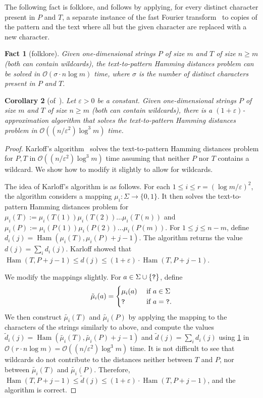 \documentclass[11pt, letterpaper]{article}
\theoremstyle{plain}
\newtheorem{fact}{Fact}
\newtheorem{corollary}[fact]{Corollary}
\theoremstyle{definition}
\theoremstyle{remark}
\renewcommand{\O}{\mathcal{O}}
\DeclareMathOperator*{\Ham}{Ham}
\begin{document}
The following fact is folklore, and follows by applying, for every distinct character present in $P$ and $T$, a separate instance of the fast Fourier transform~\cite{FischerP74} to copies of the pattern and the text where all but the given character are replaced with a new character.

\begin{fact}[folklore]\label{fact:sigman1d}
Given one-dimensional strings $P$ of size $m$ and $T$ of size $n \ge m$ (both can contain wildcards), the text-to-pattern Hamming distances problem can be solved in $\O(\sigma \cdot n \log m)$ time, where $\sigma$ is the number of distinct characters present in $P$ and $T$.
\end{fact}

\begin{corollary}[of~\cite{Karloff1993}]\label{cor:approx1d}
Let $\varepsilon > 0$ be a constant. Given one-dimensional strings $P$ of size $m$ and $T$ of size $n \ge m$ (both can contain wildcards), there is a $(1+\varepsilon)$-approximation algorithm that solves the text-to-pattern Hamming distances problem in $\O((n/\varepsilon^2)  \log^3 m)$ time.
\end{corollary}
\begin{proof}
Karloff's algorithm~\cite{Karloff1993} solves the text-to-pattern Hamming distances problem for $P,T$ in $\O((n/\varepsilon^2)  \log^3 m)$ time assuming that neither $P$ nor $T$ contains a wildcard. We show how to modify it slightly to allow for wildcards. 

The idea of Karloff's algorithm is as follows. For each $1 \le i \le r = (\log m/ \varepsilon)^2$, the algorithm considers a mapping $\mu_i : \Sigma \rightarrow \{0,1\}$. It then solves the text-to-pattern Hamming distances problem for $\mu_i(T) := \mu_i(T(1))\mu_i(T(2)) \ldots \mu_i(T(n))$ and $\mu_i(P) := \mu_i(P(1))\mu_i(P(2)) \ldots \mu_i(P(m))$. For $1 \le j \le n-m$, define $d_i(j) = \Ham(\mu_i(T), \mu_i(P)+j-1)$. The algorithm returns the value $d(j) = \sum_i d_i(j)$. Karloff showed that $\Ham(T, P+j-1) \le d(j) \le (1+\varepsilon) \cdot \Ham(T, P+j-1)$.

We modify the mappings slightly. For $a \in \Sigma \cup \{\texttt{?}\}$, define
$$
\tilde{\mu}_i(a) = 
\begin{cases}
\mu_i(a) &\text{ if } a \in \Sigma\\
\texttt{?} & \text{ if } a = \texttt{?}.
\end{cases}
$$
We then construct $\tilde{\mu_i}(T)$ and $\tilde{\mu_i}(P)$ by applying the mapping to the characters of the strings similarly to above, and compute the values $\tilde{d}_i(j) = \Ham(\tilde{\mu_i}(T), \tilde{\mu_i}(P)+j-1)$ and $\tilde{d}(j) = \sum_i d_i(j)$ using \cref{fact:sigman1d} in $\O(r \cdot n \log m) = \O((n/\varepsilon^2) \log^3 m)$ time. It is not difficult to see that wildcards do not contribute to the distances neither between $T$ and $P$, nor between $\tilde{\mu_i}(T)$ and $\tilde{\mu_i}(P)$. Therefore, $\Ham(T, P+j-1) \le \tilde{d}(j) \le (1+\varepsilon) \cdot \Ham(T, P+j-1)$, and the algorithm is correct. 
\end{proof}
\end{document}
